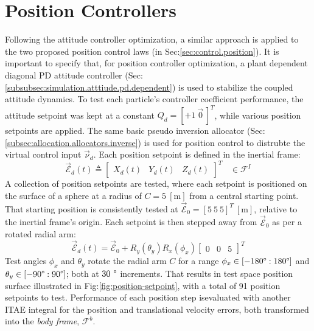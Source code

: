\section{Position Controllers}
\label{sec:simulation.position}
Following the attitude controller optimization, a similar approach is applied to the two proposed position control laws (in Sec:\ref{sec:control.position}). It is important to specify that, for position controller optimization, a plant dependent diagonal PD attitude controller (Sec:\ref{subsubsec:simulation.atttiude.pd.dependent}) is used to stabilize the coupled attitude dynamics. To test each particle's controller coefficient performance, the attitude setpoint was kept at a constant $Q_d=[+1~\vec{0}\hspace{2pt}]^T$, while various position setpoints are applied. The same basic pseudo inversion allocator (Sec:\ref{subsec:allocation.allocators.inverse}) is used for position control to distrubte the virtual control input $\vec{\nu}_d$. Each position setpoint is defined in the inertial frame:
\begin{equation}
\vec{\mathcal{E}}_d(t)\triangleq\begin{bmatrix}
X_d(t)&
Y_d(t)&
Z_d(t)
\end{bmatrix}^T
~~~~\in\mathcal{F}^{I}
\end{equation}
A collection of position setpoints are tested, where each setpoint is positioned on the surface of a sphere at a radius of $C=5~[\text{m}]$ from a central starting point. That starting position is consistently tested at $\vec{\mathcal{E}}_0=[5~5~5]^{T}~[\text{m}]$, relative to the inertial frame's origin. Each setpoint is then stepped away from $\vec{\mathcal{E}}_0$ as per a rotated radial arm:
\begin{equation}
\vec{\mathcal{E}}_d(t)=\vec{\mathcal{E}}_0+R_y(\theta_{y})R_x(\phi_{x})\begin{bmatrix}
0 & 0 & 5
\end{bmatrix}^T
\end{equation}
Test angles $\phi_x$ and $\theta_y$ rotate the radial arm  $C$ for a range $\phi_x\in[-180\text{\textdegree}:180\text{\textdegree}]$ and $\theta_y\in[-90\text{\textdegree}:90\text{\textdegree}]$; both at $30~\text{\textdegree}$ increments. That results in test space position surface illustrated in Fig:\ref{fig:position-setpoint}, with a total of 91 position setpoints to test. Performance of each position step isevaluated with another ITAE integral for the position and translational velocity errors, both transformed into the \emph{body frame}, $\mathcal{F}^{b}$. 
